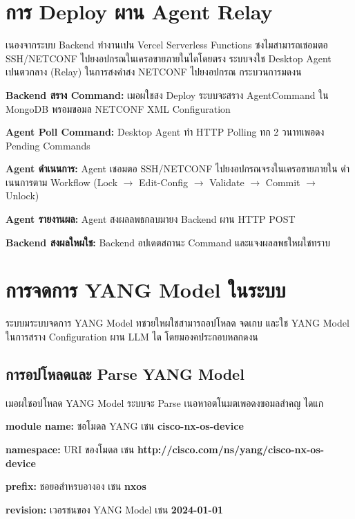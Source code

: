 \section{การ Deploy ผาน Agent Relay}
\hspace*{1.3em}
เนองจากระบบ Backend ทำงานเปน Vercel Serverless Functions ซงไมสามารถเชอมตอ SSH/NETCONF ไปยงอปกรณในเครอขายภายในไดโดยตรง ระบบจงใช Desktop Agent เปนตวกลาง (Relay) ในการสงคำสง NETCONF ไปยงอปกรณ กระบวนการมดงน

\begin{mycustomenum2}
    \item \textbf{Backend สราง Command:} เมอผใชสง Deploy ระบบจะสราง AgentCommand ใน MongoDB พรอมขอมล NETCONF XML Configuration
    \item \textbf{Agent Poll Command:} Desktop Agent ทำ HTTP Polling ทก 2 วนาทเพอดง Pending Commands
    \item \textbf{Agent ดำเนนการ:} Agent เชอมตอ SSH/NETCONF ไปยงอปกรณจรงในเครอขายภายใน ดำเนนการตาม Workflow (Lock $\rightarrow$ Edit-Config $\rightarrow$ Validate $\rightarrow$ Commit $\rightarrow$ Unlock)
    \item \textbf{Agent รายงานผล:} Agent สงผลลพธกลบมายง Backend ผาน HTTP POST
    \item \textbf{Backend สงผลใหผใช:} Backend อปเดตสถานะ Command และแจงผลลพธใหผใชทราบ
\end{mycustomenum2}

\section{การจดการ YANG Model ในระบบ}
\hspace*{1.3em}
ระบบมระบบจดการ YANG Model ทชวยใหผใชสามารถอปโหลด จดเกบ และใช YANG Model ในการสราง Configuration ผาน LLM ได โดยมองคประกอบหลกดงน

\subsection{การอปโหลดและ Parse YANG Model}
\hspace*{1.3em}
เมอผใชอปโหลด YANG Model ระบบจะ Parse เนอหาอตโนมตเพอดงขอมลสำคญ ไดแก

\begin{mycustomenum2}
    \item \textbf{module name:} ชอโมดล YANG เชน \textbf{cisco-nx-os-device}
    \item \textbf{namespace:} URI ของโมดล เชน \textbf{http://cisco.com/ns/yang/cisco-nx-os-device}
    \item \textbf{prefix:} ชอยอสำหรบอางอง เชน \textbf{nxos}
    \item \textbf{revision:} เวอรชนของ YANG Model เชน \textbf{2024-01-01}
\end{mycustomenum2}

